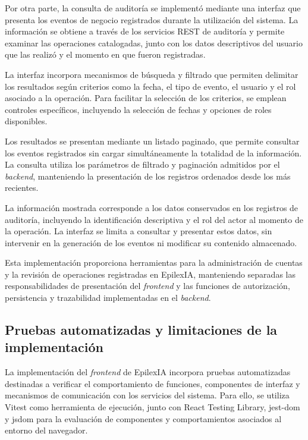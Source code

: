 Por otra parte, la consulta de auditoría
se implementó mediante una interfaz
que presenta los eventos de negocio
registrados durante la utilización
del sistema. La información se obtiene
a través de los servicios REST de
auditoría y permite examinar las
operaciones catalogadas, junto con
los datos descriptivos del usuario
que las realizó y el momento en
que fueron registradas.

La interfaz incorpora mecanismos de
búsqueda y filtrado que permiten
delimitar los resultados según
criterios como la fecha, el tipo
de evento, el usuario y el rol
asociado a la operación. Para
facilitar la selección de los
criterios, se emplean controles
específicos, incluyendo la
selección de fechas y opciones
de roles disponibles.

Los resultados se presentan mediante
un listado paginado, que permite
consultar los eventos registrados
sin cargar simultáneamente la
totalidad de la información.
La consulta utiliza los parámetros
de filtrado y paginación admitidos
por el \textit{backend}, manteniendo
la presentación de los registros
ordenados desde los más recientes.

La información mostrada corresponde
a los datos conservados en los
registros de auditoría, incluyendo
la identificación descriptiva
y el rol del actor al momento
de la operación. La interfaz
se limita a consultar y presentar
estos datos, sin intervenir
en la generación de los eventos
ni modificar su contenido
almacenado.

Esta implementación proporciona
herramientas para la administración
de cuentas y la revisión de
operaciones registradas en EpilexIA,
manteniendo separadas las
responsabilidades de presentación
del \textit{frontend} y las funciones
de autorización, persistencia
y trazabilidad implementadas
en el \textit{backend}.


\subsection{Pruebas automatizadas y limitaciones de la implementación}

La implementación del \textit{frontend} de EpilexIA
incorpora pruebas automatizadas destinadas
a verificar el comportamiento de funciones,
componentes de interfaz y mecanismos de
comunicación con los servicios del sistema.
Para ello, se utiliza Vitest como herramienta
de ejecución, junto con React Testing Library,
jest-dom y jsdom para la evaluación de
componentes y comportamientos asociados
al entorno del navegador.

